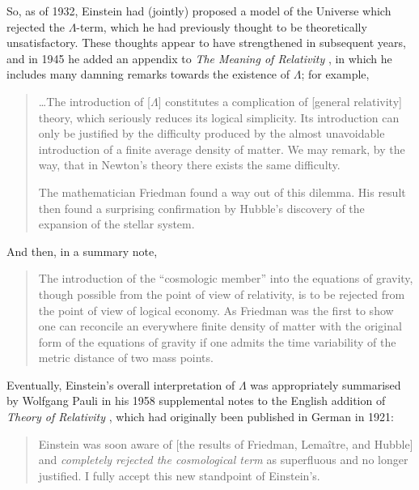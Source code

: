 So, as of 1932, Einstein had (jointly) proposed a model of the Universe which rejected the $\Lambda$-term, which he had previously thought to be theoretically unsatisfactory. These thoughts appear to have strengthened in subsequent years, and in 1945 he added an appendix to \textit{The Meaning of Relativity} \cite{Einstein1945}, in which he includes many damning remarks towards the existence of $\Lambda$; for example,
\begin{quotation}
\ldots The introduction of [$\Lambda$] constitutes a complication of [general relativity] theory, which seriously reduces its logical simplicity. Its introduction can only be justified by the difficulty produced by the almost unavoidable introduction of a finite average density of matter. We may remark, by the way, that in Newton's theory there exists the same difficulty.

The mathematician Friedman found a way out of this dilemma. His result then found a surprising confirmation by Hubble's discovery of the expansion of the stellar system.
\end{quotation}
And then, in a summary note, 
\begin{quotation}
The introduction of the ``cosmologic member'' into the equations of gravity, though possible from the point of view of relativity, is to be rejected from the point of view of logical economy. As Friedman was the first to show one can reconcile an everywhere finite density of matter with the original form of the equations of gravity if one admits the time variability of the metric distance of two mass points.
\end{quotation}

Eventually, Einstein's overall interpretation of $\Lambda$ was appropriately summarised by Wolfgang Pauli in his 1958 supplemental notes to the English addition of \textit{Theory of Relativity} \cite{Pauli1958}, which had originally been published in German in 1921:
\begin{quotation}
Einstein was soon aware of [the results of Friedman, Lema\^{i}tre, and Hubble] and \textit{completely rejected the cosmological term} as superfluous and no longer justified. I fully accept this new standpoint of Einstein's.
\end{quotation}

